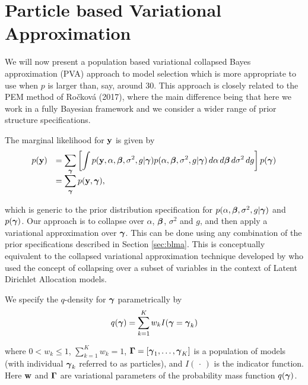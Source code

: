 \section{Particle based Variational Approximation}
\label{sec:pb-pva}

We will now present a population based variational collapsed Bayes approximation (PVA) approach to model 
selection which is more appropriate to use when $p$ is larger than, say, around $30$. This approach is closely related to the PEM  method of Ro\v{c}kov\'{a} (2017), 
where the main difference being that here we work in a fully Bayesian framework
and we consider a wider range of prior structure specifications.

The marginal likelihood for ${\bf y}$ is given by
$$
\begin{array}{rl}
\displaystyle p({\bf y}) 
& \displaystyle = \sum_{{\boldsymbol \gamma}} \left[ \int p({\bf y},\alpha,{\boldsymbol \beta},\sigma^2,g|{\boldsymbol \gamma}) p(\alpha,{\boldsymbol \beta},\sigma^2,g|{\boldsymbol \gamma}) \, d\alpha \, d{\boldsymbol \beta} \, d\sigma^2 \, dg\right] p({\boldsymbol \gamma}) 
\\
& \displaystyle = \sum_{{\boldsymbol \gamma}} p({\bf y},{\boldsymbol \gamma}),
\end{array} 
$$

\noindent which is generic to the  prior distribution specification for 
$p(\alpha,{\boldsymbol \beta},\sigma^2,g|{\boldsymbol \gamma})$ and $p({\boldsymbol \gamma})$. 
Our approach is to collapse over $\alpha$, ${\boldsymbol \beta}$, $\sigma^2$ and $g$,
and then apply a variational approximation over ${\boldsymbol \gamma}$.
This can be done using any combination of the prior specifications
described in Section \ref{sec:blma}.
This is conceptually equivalent to the collapsed
variational approximation technique developed by \cite{Teh2006}  
who used the concept of collapsing over a subset of variables in the
context of  Latent Dirichlet Allocation models.

We specify the $q$-density for ${\boldsymbol \gamma}$ parametrically by
\begin{equation}\label{eq:qgamma} 
q({\boldsymbol \gamma}) = \sum_{k=1}^K w_k I({\boldsymbol \gamma} = {\boldsymbol \gamma}_k)
\end{equation} 

\noindent 
where $0 < w_k \le 1$, $\sum_{k=1}^K w_k = 1$, ${\boldsymbol \Gamma} = [{\boldsymbol \gamma}_1,\ldots,{\boldsymbol \gamma}_K]$ is a population of models 
(with
individual ${\boldsymbol \gamma}_k$ referred to as particles), and $I(\,\cdot\,)$
is the indicator function. Here
${\bf w}$ and ${\boldsymbol \Gamma}$ are variational parameters of the probability mass function 
$q({\boldsymbol \gamma})$.

